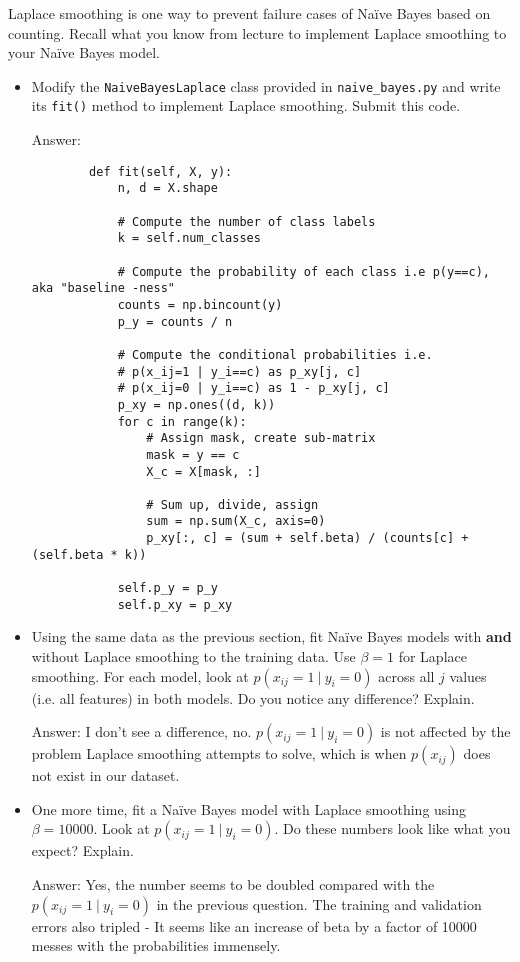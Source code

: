 \documentclass{article}
\newcommand{\blu}[1]{{\textcolor{blu}{#1}}}
\newenvironment{answer}{\par\begingroup\color{gre}Answer: }{\endgroup}
\let\ask\blu
\begin{document}
    Laplace smoothing is one way to prevent failure cases of Na\"ive Bayes based on counting. Recall what you know from lecture to implement Laplace smoothing to your Na\"ive Bayes model.
    \begin{itemize}
        \item Modify the \texttt{NaiveBayesLaplace} class provided in \texttt{naive\_bayes.py} and write its \texttt{fit()} method to implement Laplace smoothing. \ask{Submit this code.}
        \begin{answer}
        \begin{verbatim}
        def fit(self, X, y):
            n, d = X.shape

            # Compute the number of class labels
            k = self.num_classes

            # Compute the probability of each class i.e p(y==c), aka "baseline -ness"
            counts = np.bincount(y)
            p_y = counts / n

            # Compute the conditional probabilities i.e.
            # p(x_ij=1 | y_i==c) as p_xy[j, c]
            # p(x_ij=0 | y_i==c) as 1 - p_xy[j, c]
            p_xy = np.ones((d, k))
            for c in range(k):
                # Assign mask, create sub-matrix
                mask = y == c
                X_c = X[mask, :]

                # Sum up, divide, assign
                sum = np.sum(X_c, axis=0)
                p_xy[:, c] = (sum + self.beta) / (counts[c] + (self.beta * k))

            self.p_y = p_y
            self.p_xy = p_xy
        \end{verbatim}
        \end{answer}
        \item Using the same data as the previous section, fit Na\"ive Bayes models with \textbf{and} without Laplace smoothing to the training data. Use $\beta=1$ for Laplace smoothing. For each model, look at $p(x_{ij} = 1 \ | \ y_i = 0)$ across all $j$ values (i.e. all features) in both models. \ask{Do you notice any difference? Explain.}
        \begin{answer}
        I don't see a difference, no. $p(x_{ij} = 1 \ | \ y_i = 0)$ is not affected by the problem Laplace smoothing attempts to solve, which is when $p(x_{ij})$ does not exist in our dataset. 
        \end{answer}
        \item One more time, fit a Na\"ive Bayes model with Laplace smoothing using $\beta=10000$. Look at $p(x_{ij} = 1 \ | \ y_i = 0)$. \ask{Do these numbers look like what you expect? Explain.}
        \begin{answer}
        Yes, the number seems to be doubled compared with the $p(x_{ij} = 1 \ | \ y_i = 0)$ in the previous question. The training and validation errors also tripled - It seems like an increase of beta by a factor of 10000 messes with the probabilities immensely. 
        \end{answer}
    \end{itemize}
\end{document}
